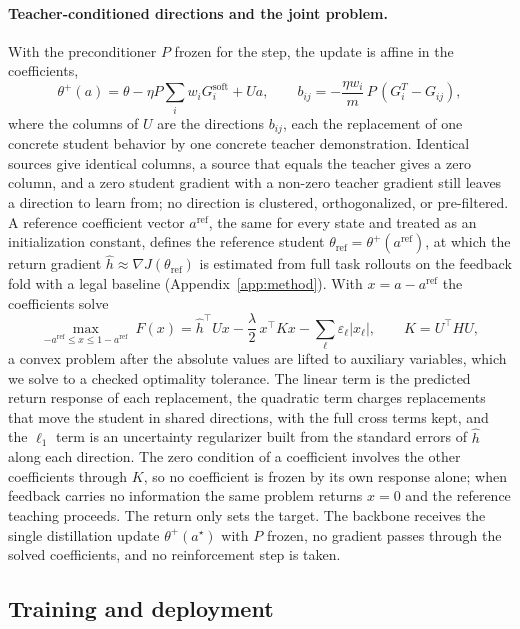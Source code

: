 \paragraph{Teacher-conditioned directions and the joint problem.}
With the preconditioner $P$ frozen for the step, the update is affine
in the coefficients,
\[
\theta^{+}(a)=\theta-\eta P\sum_i w_iG_i^{\mathrm{soft}}+Ua,
\qquad
b_{ij}=-\frac{\eta w_i}{m}\,P\,(G_i^T-G_{ij}),
\]
where the columns of $U$ are the directions $b_{ij}$, each the
replacement of one concrete student behavior by one concrete teacher
demonstration. Identical sources give identical columns, a source that
equals the teacher gives a zero column, and a zero student gradient
with a non-zero teacher gradient still leaves a direction to learn
from; no direction is clustered, orthogonalized, or pre-filtered. A
reference coefficient vector $a^{\mathrm{ref}}$, the same for every
state and treated as an initialization constant, defines the reference
student $\theta_{\mathrm{ref}}=\theta^{+}(a^{\mathrm{ref}})$, at which
the return gradient $\hat h\approx\nabla J(\theta_{\mathrm{ref}})$ is
estimated from full task rollouts on the feedback fold with a legal
baseline (Appendix~\ref{app:method}). With $x=a-a^{\mathrm{ref}}$ the
coefficients solve
\[
\max_{-a^{\mathrm{ref}}\le x\le 1-a^{\mathrm{ref}}}\;
F(x)=\hat h^{\top}Ux-\frac{\lambda}{2}\,x^{\top}Kx
-\sum_{\ell}\varepsilon_\ell|x_\ell|,
\qquad K=U^{\top}HU,
\]
a convex problem after the absolute values are lifted to auxiliary
variables, which we solve to a checked optimality tolerance. The
linear term is the predicted return response of each replacement, the
quadratic term charges replacements that move the student in shared
directions, with the full cross terms kept, and the $\ell_1$ term is
an uncertainty regularizer built from the standard errors of $\hat h$
along each direction. The zero condition of a coefficient involves the
other coefficients through $K$, so no coefficient is frozen by its own
response alone; when feedback carries no information the same problem
returns $x=0$ and the reference teaching proceeds. The return only
sets the target. The backbone receives the single distillation update
$\theta^{+}(a^{\star})$ with $P$ frozen, no gradient passes through
the solved coefficients, and no reinforcement step is taken.

\subsection{Training and deployment}\label{sec:behavior}


